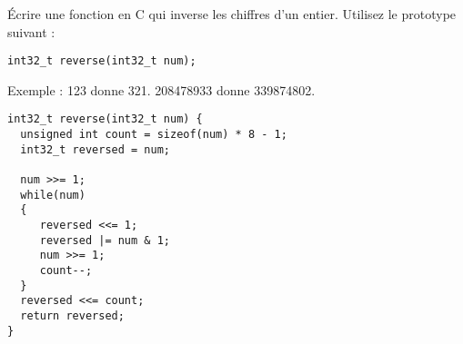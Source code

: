 \documentclass[french,a4paper,addpoints,11pt]{exam}
\begin{document}
\begin{questions}

\question Écrire une fonction en C qui inverse les chiffres d'un entier. Utilisez le prototype suivant :

\begin{lstlisting}
int32_t reverse(int32_t num);
\end{lstlisting}

Exemple : 123 donne 321. 208478933 donne 339874802.
  
\ifprintanswers
\begin{solution}
\begin{lstlisting}
int32_t reverse(int32_t num) {
  unsigned int count = sizeof(num) * 8 - 1;
  int32_t reversed = num;
    
  num >>= 1; 
  while(num)
  {
     reversed <<= 1;       
     reversed |= num & 1;
     num >>= 1;
     count--;
  }
  reversed <<= count;
  return reversed;
}
\end{lstlisting}
\end{solution}
\else
\fillwithdottedlines{10cm}
\fi


\end{questions}
\end{document}
